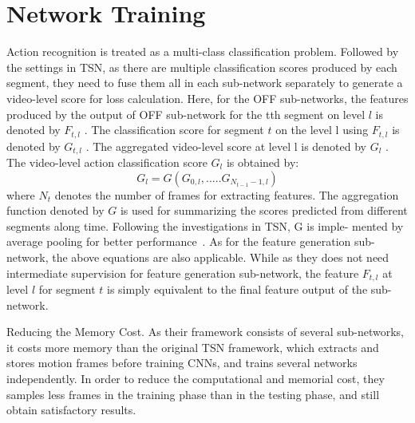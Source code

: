 \documentclass[10pt,twocolumn,letterpaper]{article}
\begin{document}
\section{Network Training}
Action recognition is treated as a multi-class classification problem. Followed by the settings in TSN, as there are multiple classification scores produced by each segment, they need to fuse them all in each sub-network separately to generate a video-level score for loss calculation. Here, for the OFF sub-networks, the features produced by the output of OFF sub-network for the tth segment on level $l$ is denoted
by $F_{t,l}$ . The classification score for segment $t$ on the level
l using $F_{t,l}$ is denoted by $G_{t,l}$ . The aggregated video-level
score at level l is denoted by $G_l$ . The video-level action
classification score $G_l$ is obtained by:
\begin{equation}
G_l=G(G_{0,l},.....G_{N_{t-1}-1,l})
\end{equation}
where $N_t$ denotes the number of frames for extracting features. The aggregation function denoted by $G$ is used for
summarizing the scores predicted from different segments along time. Following the investigations in TSN, G is imple-
mented by average pooling for better performance~\cite{name34}. As for the feature generation sub-network, the above equations
are also applicable. While as they does not need intermediate supervision for feature generation sub-network, the feature
$F_{t,l}$ at level $l$ for segment $t$ is simply equivalent to the final feature output of the sub-network.
\par Reducing the Memory Cost. As their framework consists of several sub-networks, it costs more memory than the original TSN framework, which extracts and stores motion frames before training CNNs, and trains several networks independently. In order to reduce the computational and
memorial cost, they samples less frames in the training phase than in the testing phase, and still obtain satisfactory results.
\end{document}
